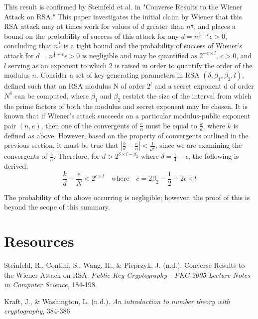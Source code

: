 \documentclass[a4paper]{article}
\begin{document}
This result is confirmed by Steinfeld et al. in "Converse Results to the Wiener Attack on RSA." This paper investigates the initial claim by Wiener that this RSA attack may at times work for values of $d$ greater than $n^{\frac{1}{4}}$, and places a bound on the probability of success of this attack for any $d = n^{\frac{1}{4} + \epsilon} \epsilon > 0$, concluding that $n^{\frac{1}{4}}$ is a tight bound and the probability of success of Wiener's attack for $d = n^{\frac{1}{4} + \epsilon} \epsilon > 0$ is negligible and may be quantified as $2^{-c \times l}$, $c  > 0$, and $l$ serving as an exponent to which 2 is raised in order to quantify the order of the modulus $n$. Consider a set of key-generating parameters in RSA $(\delta, \beta_{1}, \beta_{2}, l)$, defined such that an RSA modulus N of order $2^{l}$ and a secret exponent d of order $N^{\delta}$ can be computed, where $\beta_{1}$ and $\beta_{2}$ restrict the size of the interval from which the prime factors of both the modulus and secret exponent may be chosen. It is known that if Wiener's attack succeeds on a particular modulus-public exponent pair $(n, e)$, then one of the convergents of $\frac{e}{n}$ must be equal to $\frac{k}{d}$, where $k$ is defined as above. However, based on the property of convergents outlined in the previous section, it must be true that $|\frac{k}{d} - \frac{e}{n}| < \frac{1}{d^{2}}$, since we are examining the convergents of $\frac{e}{n}$. Therefore, for $d > 2^{\delta \times l - \beta_{2}}$ where $\delta = \frac{1}{4} + \epsilon$, the following is derived: \begin{equation}
\frac{k}{d} - \frac{e}{N} < 2^{c \times l} \quad \text{where} \quad c = 2\beta_{2}-\frac{1}{2} + 2\epsilon \times l
\end{equation}\par
The probability of the above occurring is negligible; however, the proof of this is beyond the scope of this summary.
\section{Resources}
Steinfeld, R., Contini, S., Wang, H., \& Pieprzyk, J. (n.d.). Converse Results to the Wiener Attack on RSA. \textit{Public Key Cryptography - PKC 2005 Lecture Notes in Computer Science}, 184-198.
\vspace{.1in}

\noindent Kraft, J., \& Washington, L. (n.d.). \textit{An introduction to number theory with cryptography}, 384-386
\end{document}
